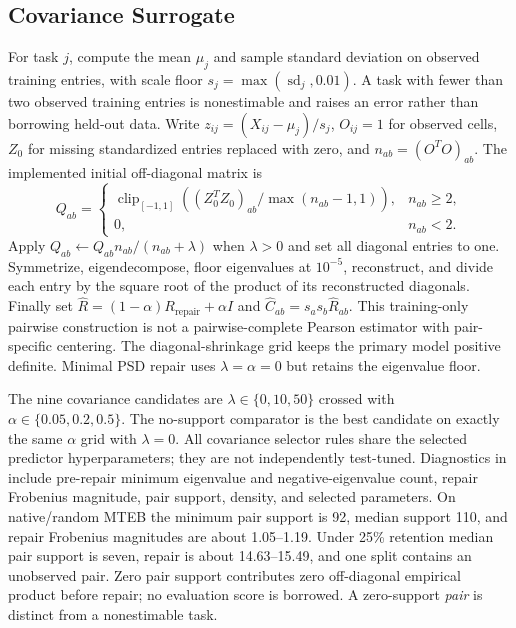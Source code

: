 \documentclass{article}
\newcommand{\artifact}[1]{\path{#1}}
\begin{document}
\subsection{Covariance Surrogate}
For task $j$, compute the mean $\mu_j$ and sample standard deviation on observed training entries, with scale floor $s_j=\max(\operatorname{sd}_j,0.01)$. A task with fewer than two observed training entries is nonestimable and raises an error rather than borrowing held-out data. Write $z_{ij}=(X_{ij}-\mu_j)/s_j$, $O_{ij}=1$ for observed cells, $Z_0$ for missing standardized entries replaced with zero, and $n_{ab}=(O^TO)_{ab}$. The implemented initial off-diagonal matrix is
\begin{equation}
Q_{ab}=\begin{cases}
\operatorname{clip}_{[-1,1]}\!\left((Z_0^TZ_0)_{ab}/\max(n_{ab}-1,1)\right),&n_{ab}\ge2,\\
0,&n_{ab}<2.
\end{cases}
\end{equation}
Apply $Q_{ab}\leftarrow Q_{ab}n_{ab}/(n_{ab}+\lambda)$ when $\lambda>0$ and set all diagonal entries to one. Symmetrize, eigendecompose, floor eigenvalues at $10^{-5}$, reconstruct, and divide each entry by the square root of the product of its reconstructed diagonals. Finally set $\hat R=(1-\alpha)R_{\mathrm{repair}}+\alpha I$ and $\hat C_{ab}=s_as_b\hat R_{ab}$. This training-only pairwise construction is not a pairwise-complete Pearson estimator with pair-specific centering. The diagonal-shrinkage grid keeps the primary model positive definite. Minimal PSD repair uses $\lambda=\alpha=0$ but retains the eigenvalue floor.

The nine covariance candidates are $\lambda\in\{0,10,50\}$ crossed with $\alpha\in\{0.05,0.2,0.5\}$. The no-support comparator is the best candidate on exactly the same $\alpha$ grid with $\lambda=0$. All covariance selector rules share the selected predictor hyperparameters; they are not independently test-tuned. Diagnostics in \artifact{artifacts/analysis/fit_configs.csv} include pre-repair minimum eigenvalue and negative-eigenvalue count, repair Frobenius magnitude, pair support, density, and selected parameters. On native/random MTEB the minimum pair support is 92, median support 110, and repair Frobenius magnitudes are about 1.05--1.19. Under 25\% retention median pair support is seven, repair is about 14.63--15.49, and one split contains an unobserved pair. Zero pair support contributes zero off-diagonal empirical product before repair; no evaluation score is borrowed. A zero-support \emph{pair} is distinct from a nonestimable task.
\end{document}

